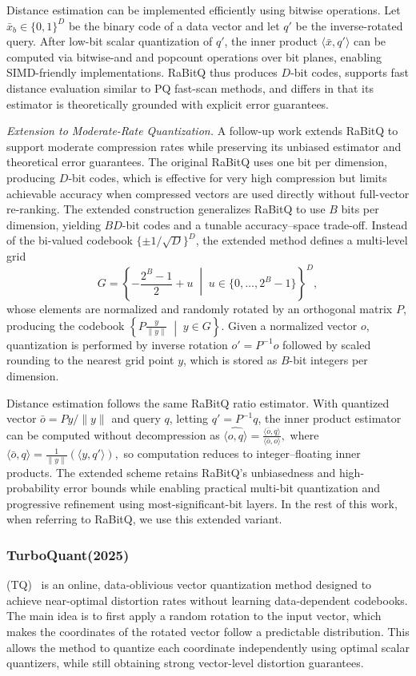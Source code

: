 \documentclass[sigconf]{acmart}
\begin{document}
Distance estimation can be implemented efficiently using bitwise operations. 
Let $\bar{x}_b \in \{0,1\}^D$ be the binary code of a data vector and let $q'$ be the inverse-rotated query. 
After low-bit scalar quantization of $q'$, the inner product $\langle \bar{x}, q' \rangle$ can be computed via bitwise-and and popcount operations over bit planes, enabling SIMD-friendly implementations. 
RaBitQ thus produces $D$-bit codes, supports fast distance evaluation similar to PQ fast-scan methods, and differs in that its estimator is theoretically grounded with explicit error guarantees.

\emph{Extension to Moderate-Rate Quantization.}
A follow-up work extends RaBitQ to support moderate compression rates while preserving its unbiased estimator and theoretical error guarantees. 
The original RaBitQ uses one bit per dimension, producing $D$-bit codes, which is effective for very high compression but limits achievable accuracy when compressed vectors are used directly without full-vector re-ranking. 
The extended construction generalizes RaBitQ to use $B$ bits per dimension, yielding $BD$-bit codes and a tunable accuracy–space trade-off. 
Instead of the bi-valued codebook 
$\{\pm 1/\sqrt{D}\}^D$, the extended method defines a multi-level grid
\[
G = \left\{
-\frac{2^{B}-1}{2} + u \;\middle|\;
u \in \{0,\dots,2^{B}-1\}
\right\}^{D},
\]
whose elements are normalized and randomly rotated by an orthogonal matrix $P$, producing the codebook
\(\left\{P \frac{y}{\|y\|} \;\middle|\; y \in G \right\}.\)
Given a normalized vector $o$, quantization is performed by inverse rotation $o' = P^{-1}o$ followed by scaled rounding to the nearest grid point $y$, which is stored as $B$-bit integers per dimension.

Distance estimation follows the same RaBitQ ratio estimator. 
With quantized vector $\bar o = P y / \|y\|$ and query $q$, letting $q' = P^{-1} q$, the inner product estimator can be computed without decompression as
\(\widehat{\langle o,q\rangle} = \frac{\langle \bar o, q\rangle}{\langle \bar o, o\rangle}, \) where
\(\langle \bar o, q\rangle = \frac{1}{\|y\|} \left(\langle y, q' \rangle \right),\)
so computation reduces to integer–floating inner products. 
The extended scheme retains RaBitQ’s unbiasedness and high-probability error bounds while enabling practical multi-bit quantization and progressive refinement using most-significant-bit layers. In the rest of this work, when referring to RaBitQ, we use this extended variant.


\subsubsection{\textbf{TurboQuant(2025)}}(TQ)~\cite{zandieh2025turboquant} is an online, data-oblivious vector quantization method designed to achieve near-optimal distortion rates without learning data-dependent codebooks.
The main idea is to first apply a random rotation to the input vector, which makes the coordinates of the rotated vector follow a predictable distribution. 
This allows the method to quantize each coordinate independently using optimal scalar quantizers, while still obtaining strong vector-level distortion guarantees.
\end{document}
